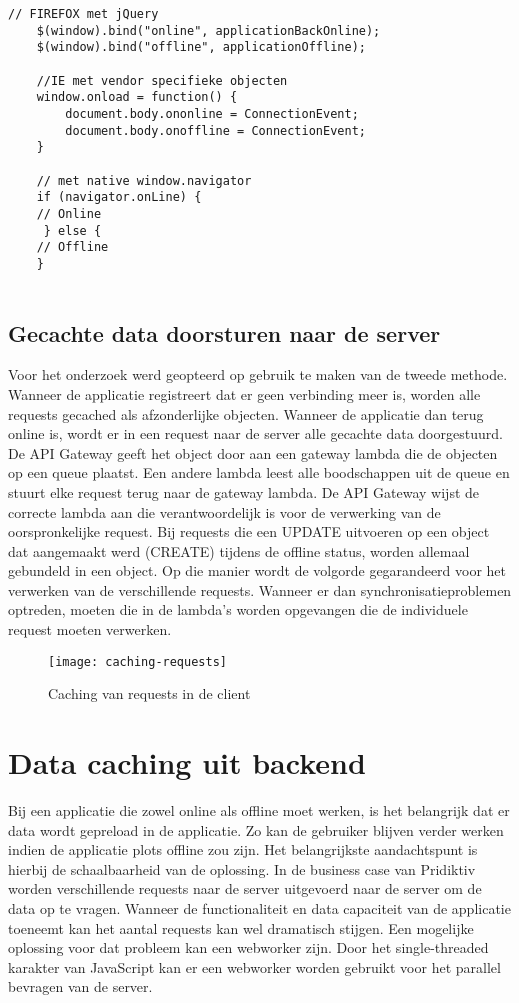 \begin{lstlisting}[caption=DOM API's voor controleren offline en online status]
    // FIREFOX met jQuery
    $(window).bind("online", applicationBackOnline); 
    $(window).bind("offline", applicationOffline);

    //IE met vendor specifieke objecten
    window.onload = function() {
        document.body.ononline = ConnectionEvent;
        document.body.onoffline = ConnectionEvent;
    }
    
    // met native window.navigator
    if (navigator.onLine) {
  	// Online
     } else {
  	// Offline
	}
    
\end{lstlisting}

\subsection{Gecachte data doorsturen naar de server}
Voor het onderzoek werd geopteerd op gebruik te maken van de tweede methode. Wanneer de applicatie registreert dat er geen verbinding meer is, worden alle requests gecached als afzonderlijke objecten. Wanneer de applicatie dan terug online is, wordt er in een request naar de server alle gecachte data doorgestuurd. De API Gateway geeft het object door aan een gateway lambda die de objecten op een queue plaatst.  Een andere lambda leest alle boodschappen uit de queue en stuurt elke request terug naar de gateway lambda. De API Gateway wijst de correcte lambda aan die verantwoordelijk is voor de verwerking van de oorspronkelijke request. Bij requests die een UPDATE uitvoeren op een object dat aangemaakt werd (CREATE) tijdens de offline status, worden allemaal gebundeld in een object. Op die manier wordt de volgorde gegarandeerd voor het verwerken van de verschillende requests. Wanneer er dan synchronisatieproblemen optreden, moeten die in de lambda's worden opgevangen die de individuele request moeten verwerken.

\begin{figure}[h]
\caption{Caching van requests in de client}
\centering
\texttt{[image: caching-requests]}
\end{figure}

\section{Data caching uit backend}
Bij een applicatie die zowel online als offline moet werken, is het belangrijk dat er data wordt gepreload in de applicatie. Zo kan de gebruiker blijven verder werken indien de applicatie plots offline zou zijn. Het belangrijkste aandachtspunt is hierbij de schaalbaarheid van de oplossing. In de business case van Pridiktiv worden verschillende requests naar de server uitgevoerd naar de server om de data op te vragen. Wanneer de functionaliteit en data capaciteit van de applicatie toeneemt kan het aantal requests kan wel dramatisch stijgen. Een mogelijke oplossing voor dat probleem kan een webworker zijn. Door het single-threaded karakter van JavaScript kan er een webworker worden gebruikt voor het parallel bevragen van de server.

